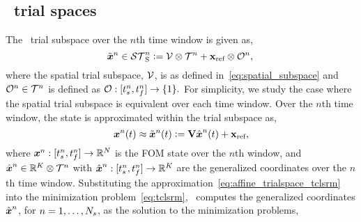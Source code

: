 \subsection{\spatialAcronym\ trial spaces}
The \spatialAcronym\ trial subspace over the $n$th time window is given as, 
\begin{equation}\label{eq:sttrialspace}
 \tilde{\boldsymbol x}^{n} \in \mathcal{ ST }_{\text{S}}^{n} \vcentcolon= 
\mathcal{V } \otimes \mathcal{T}^{n} +
	\mathbf{x}_\text{ref}\otimes\mathcal{O}^n,\\ 
\end{equation}
where the spatial trial subspace, $\mathcal{V }$, is as defined in~\eqref{eq:spatial_subspace} and 
$\mathcal{O}^n\in\mathcal{T}^{n}$ is defined as $\mathcal{O}:[t_s^{n},t_f^{n}]\rightarrow\{1\}.$
For simplicity, we study the case 
where the spatial trial subspace is equivalent over each time window. Over the $n$th time window, the state is approximated within the trial subspace as, 
\begin{equation}\label{eq:affine_trialspace_tclsrm}
{\boldsymbol x}^{n}(t) \approx \tilde{\boldsymbol x}^{n}(t) \vcentcolon= \mathbf {V} \hat{ \boldsymbol x}^{n}(t) + \mathbf{x}_\text{ref},
\end{equation}
where ${\boldsymbol x}^{n}: [t_s^{n},t_f^{n}] \rightarrow \mathbb{R}^{N}$ is the FOM state over the $n$th window, and $\hat{ \boldsymbol x}^{n} \in \mathbb{R}^{K} \otimes \mathcal{T}^{n}$ with $\hat{ \boldsymbol x}^{n}: [t_s^{n},t_f^{n}] \rightarrow \mathbb{R}^{K}$ are the generalized coordinates over the $n$th time window. 
Substituting the approximation~\eqref{eq:affine_trialspace_tclsrm} into the minimization problem~\eqref{eq:tclsrm}, \methodAcronym\ computes  
the generalized coordinates $\hat{ \boldsymbol x}^{n}$, for $n = 1,\ldots,N_s$, as the solution to the minimization problems,

